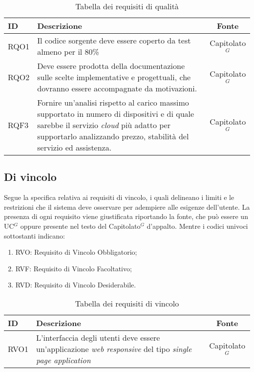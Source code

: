 \begin{table}[H]
	\renewcommand{\arraystretch}{1.5}
	\centering
	\begin{tabularx}{\textwidth}{l|X|c}
		\textbf{ID} & \textbf{Descrizione}                                                                                                                                                                                                 & \textbf{Fonte} \\
		\hline
		RQO1        & Il codice sorgente deve essere coperto da test almeno per il 80\%                                                                                                                                                    & \gls{Capitolato}$^G$     \\
		\hline
		RQO2        & Deve essere prodotta della documentazione sulle scelte implementative e progettuali, che dovranno essere accompagnate da motivazioni.                                                                                & \gls{Capitolato}$^G$     \\
		\hline
		RQF3        & Fornire un'analisi rispetto al carico massimo supportato in numero di dispositivi e di quale sarebbe il servizio \textit{cloud} più adatto per supportarlo analizzando prezzo, stabilità del servizio ed assistenza. & \gls{Capitolato}$^G$     \\
		\hline
	\end{tabularx}
	\caption{Tabella dei requisiti di qualità}
\end{table}

\subsection{Di vincolo}

Segue la specifica relativa ai requisiti di vincolo, i quali delineano i limiti e le restrizioni che il sistema deve osservare per adempiere alle esigenze dell'utente.
La presenza di ogni requisito viene giustificata riportando la fonte, che può essere un \gls{UC}$^G$ oppure presente
nel testo del \gls{Capitolato}$^G$ d'appalto. Mentre i codici univoci sottostanti indicano:
\begin{enumerate}
	\item RVO: Requisito di Vincolo Obbligatorio;
	\item RVF: Requisito di Vincolo Facoltativo;
	\item RVD: Requisito di Vincolo Desiderabile.
\end{enumerate}

\begin{table}[H]
	\renewcommand{\arraystretch}{1.5}
	\centering
	\begin{tabularx}{\textwidth}{l|X|c}
		\textbf{ID} & \textbf{Descrizione}                                                                                                     & \textbf{Fonte} \\
		\hline
		RVO1        & L'interfaccia degli utenti deve essere un'applicazione \textit{web responsive} del tipo \textit{single page application} & \gls{Capitolato}$^G$     \\
		\hline
	\end{tabularx}
	\caption{Tabella dei requisiti di vincolo}
\end{table}
